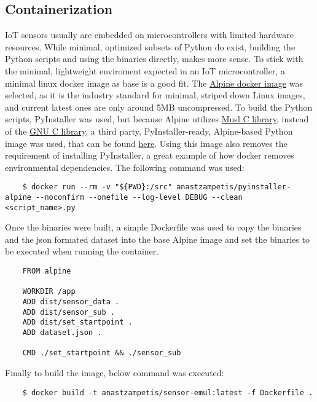 \subsection{Containerization}
IoT sensors usually are embedded on microcontrollers with limited hardware resources. While minimal, optimized subsets of Python do exist, building the Python scripts and using the binaries directly, makes more sense. To stick with the minimal, lightweight enviroment expected in an IoT microcontroller, a minimal linux docker image as base is a good fit. The \href{https://hub.docker.com/_/alpine/}{Alpine docker image} was selected, as it is the industry standard for minimal, striped down Linux images, and current latest ones are only around 5MB uncompressed. To build the Python scripts, PyInstaller was used, but because Alpine utilizes \href{https://musl.libc.org/}{Musl C library}, instead of the \href{https://www.gnu.org/software/libc/}{GNU C library}, a third party, PyInstaller-ready, Alpine-based Python image was used, that can be found \href{https://github.com/six8/pyinstaller-alpine}{here}. Using this image also removes the requirement of installing PyInstaller, a great example of how docker removes environmental dependencies. The following command was used:
\begin{verbatim}
    $ docker run --rm -v "${PWD}:/src" anastzampetis/pyinstaller-alpine --noconfirm --onefile --log-level DEBUG --clean <script_name>.py
\end{verbatim}
Once the binaries were built, a simple Dockerfile was used to copy the binaries and the json formated dataset into the base Alpine image and set the binaries to be executed when running the container.
\begin{verbatim}
    FROM alpine

    WORKDIR /app
    ADD dist/sensor_data .
    ADD dist/sensor_sub .
    ADD dist/set_startpoint .
    ADD dataset.json .

    CMD ./set_startpoint && ./sensor_sub
\end{verbatim}  
Finally to build the image, below command was executed:
\begin{verbatim}
    $ docker build -t anastzampetis/sensor-emul:latest -f Dockerfile .
\end{verbatim}

